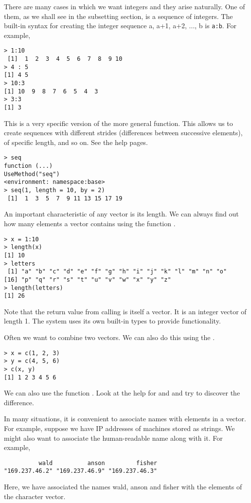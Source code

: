 There are many cases in which we want integers and they arise
naturally. One of them, as we shall see in the subsetting section, is
a sequence of integers. The built-in syntax for creating the integer
sequence a, a+1, a+2, ..., b is \verb|a:b|. For example,
\begin{verbatim}
> 1:10
 [1]  1  2  3  4  5  6  7  8  9 10
> 4 : 5
[1] 4 5
> 10:3
[1] 10  9  8  7  6  5  4  3
> 3:3
[1] 3
\end{verbatim}
This is a very specific version of the more general 
function. This allows us to create sequences with different strides
(differences between successive elements), of specific length, and so
on. See the help pages.
\begin{verbatim}
> seq
function (...) 
UseMethod("seq")
<environment: namespace:base>
> seq(1, length = 10, by = 2)
 [1]  1  3  5  7  9 11 13 15 17 19
\end{verbatim}


An important characteristic of any vector is its length. We can always
find out how many elements a vector contains using the function
.
\begin{verbatim}
> x = 1:10
> length(x)
[1] 10
> letters
 [1] "a" "b" "c" "d" "e" "f" "g" "h" "i" "j" "k" "l" "m" "n" "o"
[16] "p" "q" "r" "s" "t" "u" "v" "w" "x" "y" "z"
> length(letters)
[1] 26
\end{verbatim}
Note that the return value from calling  is itself a
vector. It is an integer vector of length 1. The system uses its own
built-in types to provide functionality.

Often we want to combine two vectors. We can also do this using the
.
\begin{verbatim}
> x = c(1, 2, 3)
> y = c(4, 5, 6)
> c(x, y)
[1] 1 2 3 4 5 6
\end{verbatim}
We can also use the function . Look at the help for
 and  and try to discover the
difference.

In many situations, it is convenient to associate names with elements
in a vector. For example, suppose we have IP addresses of machines
stored as strings. We might also want to associate the human-readable
name along with it. For example,
\begin{verbatim}
          wald          anson         fisher 
"169.237.46.2" "169.237.46.9" "169.237.46.3"
\end{verbatim}
Here, we have associated the names wald, anson and fisher with the
elements of the character vector.


